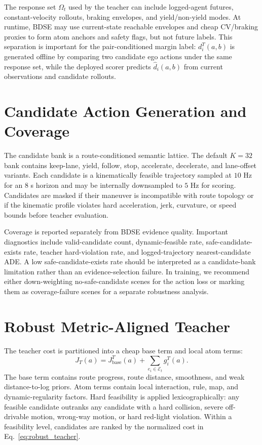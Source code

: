 \documentclass{article}
\newcommand{\E}{\mathcal{E}}
\begin{document}
The response set $\Omega_t$ used by the teacher can include logged-agent futures, constant-velocity rollouts, braking envelopes, and yield/non-yield modes. At runtime, BDSE may use current-state reachable envelopes and cheap CV/braking proxies to form atom anchors and safety flags, but not future labels. This separation is important for the pair-conditioned margin label: $d_i^T(a,b)$ is generated offline by comparing two candidate ego actions under the same response set, while the deployed scorer predicts $\hat d_i(a,b)$ from current observations and candidate rollouts.

\section{Candidate Action Generation and Coverage}
\label{app:candidate}

The candidate bank is a route-conditioned semantic lattice. The default $K=32$ bank contains keep-lane, yield, follow, stop, accelerate, decelerate, and lane-offset variants. Each candidate is a kinematically feasible trajectory sampled at $10$ Hz for an $8$ s horizon and may be internally downsampled to $5$ Hz for scoring. Candidates are masked if their maneuver is incompatible with route topology or if the kinematic profile violates hard acceleration, jerk, curvature, or speed bounds before teacher evaluation.

Coverage is reported separately from BDSE evidence quality. Important diagnostics include valid-candidate count, dynamic-feasible rate, safe-candidate-exists rate, teacher hard-violation rate, and logged-trajectory nearest-candidate ADE. A low safe-candidate-exists rate should be interpreted as a candidate-bank limitation rather than an evidence-selection failure. In training, we recommend either down-weighting no-safe-candidate scenes for the action loss or marking them as coverage-failure scenes for a separate robustness analysis.

\section{Robust Metric-Aligned Teacher}
\label{app:labels}

The teacher cost is partitioned into a cheap base term and local atom terms:
\begin{equation}
    J_T(a)=J_{\mathrm{base}}^T(a)+\sum_{e_i\in\E_t}g_i^T(a).
\end{equation}
The base term contains route progress, route distance, smoothness, and weak distance-to-log priors. Atom terms contain local interaction, rule, map, and dynamic-regularity factors. Hard feasibility is applied lexicographically: any feasible candidate outranks any candidate with a hard collision, severe off-drivable motion, wrong-way motion, or hard red-light violation. Within a feasibility level, candidates are ranked by the normalized cost in Eq.~\eqref{eq:robust_teacher}.
\end{document}
